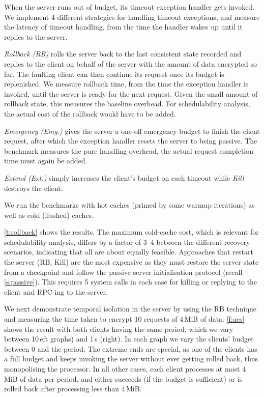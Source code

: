 When the server runs out of budget, its timeout exception handler gets
invoked. We implement 4 different strategies for handling timeout exceptions,
and measure the latency of timeout handling, from the time the handler wakes up
until it replies to the server.

\emph{Rollback (RB)} rolls the server back to the last consistent state
recorded and replies to the client on behalf of the server with the amount of data
encrypted so far. The faulting client can then continue its request once its budget is replenished.
We measure rollback time, from the time the exception handler is
invoked, until the server is ready for the next request. Given the
small amount of rollback state, this measures the baseline
    overhead. For schedulability analysis, the actual cost of the rollback would
have to be added.

\emph{Emergency (Emg.)} gives the server a one-off emergency budget to finish
the client request, after which the exception handler
resets the server to being passive. The benchmark measures the
pure handling overhead, the actual request completion time must again be added.

\emph{Extend (Ext.)} simply increases the client's budget on each timeout while \emph{Kill} destroys the client.

We run the benchmarks with hot caches (primed by some warmup
iterations)  as well as cold (flushed) caches.

\autoref{t:rollback} shows the results. The maximum
cold-cache cost, which is relevant for schedulability analysis,
differs by a factor of 3--4 between the different recovery scenarios,
indicating that all are about equally feasible.
Approaches that restart the server (RB, Kill) are the most expensive
as they must restore the server state from a
checkpoint and follow the passive server initialisation protocol
(recall \autoref{s:passive}). This requires
5 system calls in each case for killing or replying to the client and RPC-ing to the server.

We next demonstrate temporal isolation in the server by using the RB
technique and measuring the time taken to encrypt 10 requests of 4\,MiB of
data. \autoref{f:aes} shows the result with both clients having the same
period, which we vary between 10\,eft graphs) and 1\,s
(right). In each graph  we vary the clients' budget between 0 and the
period. The extreme ends are special, as one of the clients has a full
budget and keeps invoking the server without ever getting rolled back,
thus monopolising the processor. In all other cases, each client
processes at most 4\,MiB of data per period, and either succeeds (if
the budget is sufficient) or is rolled back after processing less than 4\,MiB.

